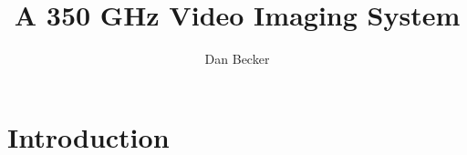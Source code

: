 \documentclass[12pt,letterpaper]{memoir}
\title{A 350 GHz Video Imaging System}
\author{Dan Becker}
\numberwithin{equation}{chapter}
\numberwithin{figure}{chapter}
\numberwithin{table}{chapter}
\begin{document}
\maketitle


\frontmatter
\tableofcontents* %

\mainmatter

\chapter{Introduction}\label{c:intro}

\end{document}
